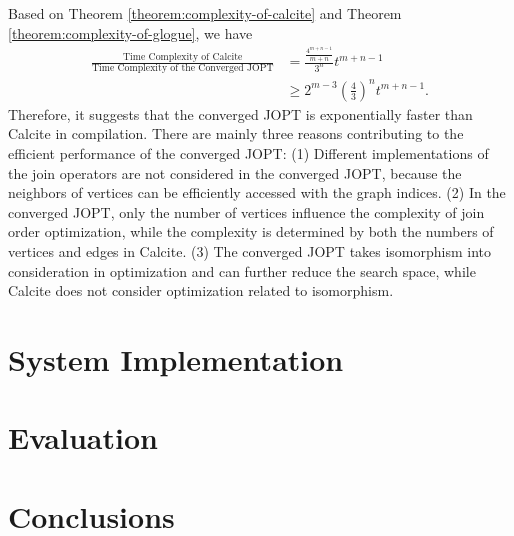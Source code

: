 \documentclass[sigconf, nonacm]{acmart}
\begin{document}
Based on Theorem \ref{theorem:complexity-of-calcite} and Theorem \ref{theorem:complexity-of-glogue}, we have 
\begin{equation*}
    \begin{split}
        \frac{\text{Time Complexity of Calcite}}{\text{Time Complexity of the Converged JOPT}} & = \frac{\frac{4^{m+n-1}}{m+n}}{3^n}t^{m+n-1} \\
        & \geq 2^{m-3}(\frac{4}{3})^nt^{m+n-1}.
    \end{split}
\end{equation*}
Therefore, it suggests that the converged JOPT is exponentially faster than Calcite in compilation.
There are mainly three reasons contributing to the efficient performance of the converged JOPT:
(1) Different implementations of the join operators are not considered in the converged JOPT, because the neighbors of vertices can be efficiently accessed with the graph indices.
(2) In the converged JOPT, only the number of vertices influence the complexity of join order optimization, while the complexity is determined by both the numbers of vertices and edges in Calcite.
(3) The converged JOPT takes isomorphism into consideration in optimization and can further reduce the search space, while Calcite does not consider optimization related to isomorphism.


\section{System Implementation}
\label{sec:system-implementation}


\section{Evaluation}
\label{sec:evaluation}


\section{Conclusions}
\label{sec:conclusions}






\end{document}
